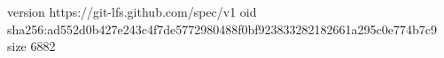 version https://git-lfs.github.com/spec/v1
oid sha256:ad552d0b427e243c4f7de5772980488f0bf923833282182661a295c0e774b7c9
size 6882
